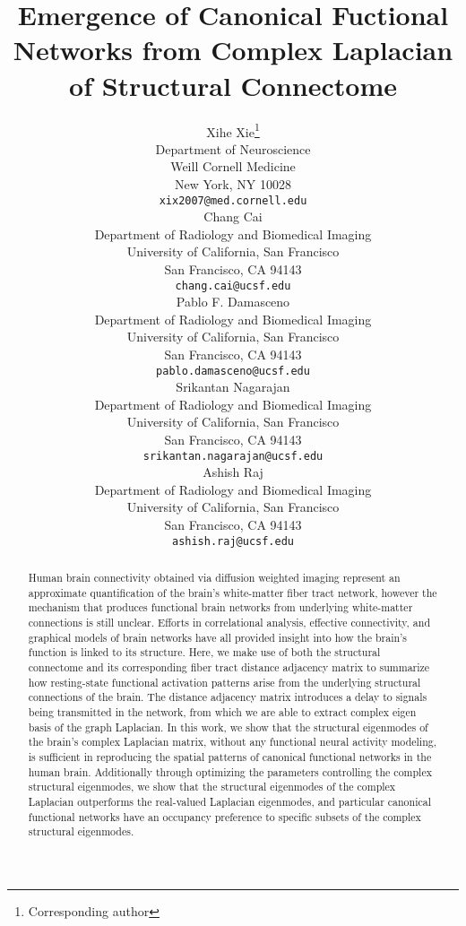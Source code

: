 \documentclass{article}
\title{Emergence of Canonical Fuctional Networks from Complex Laplacian of Structural Connectome}
\author{
  Xihe Xie\thanks{Corresponding author} \\
  Department of Neuroscience\\
  Weill Cornell Medicine\\
  New York, NY 10028 \\
  \texttt{xix2007@med.cornell.edu} \\
   \And
  Chang Cai \\
  Department of Radiology and Biomedical Imaging\\
  University of California, San Francisco\\
  San Francisco, CA 94143\\
  \texttt{chang.cai@ucsf.edu} \\
   \And
  Pablo F. Damasceno \\
  Department of Radiology and Biomedical Imaging\\
  University of California, San Francisco\\
  San Francisco, CA 94143\\
  \texttt{pablo.damasceno@ucsf.edu}\\
  \And
  Srikantan Nagarajan \\
  Department of Radiology and Biomedical Imaging\\
  University of California, San Francisco\\
  San Francisco, CA 94143\\
  \texttt{srikantan.nagarajan@ucsf.edu} \\
  \And
  Ashish Raj \\
  Department of Radiology and Biomedical Imaging\\
  University of California, San Francisco\\
  San Francisco, CA 94143\\
  \texttt{ashish.raj@ucsf.edu} \\
}
\begin{document}
\maketitle

\begin{abstract}
Human brain connectivity obtained via diffusion weighted imaging represent an approximate quantification of the brain's white-matter fiber tract network, however the mechanism that produces functional brain networks from underlying white-matter connections is still unclear. Efforts in correlational analysis, effective connectivity, and graphical models of brain networks have all provided insight into how the brain's function is linked to its structure. Here, we make use of both the structural connectome and its corresponding fiber tract distance adjacency matrix to summarize how resting-state functional activation patterns arise from the underlying structural connections of the brain. The distance adjacency matrix introduces a delay to signals being transmitted in the network, from which we are able to extract complex eigen basis of the graph Laplacian. In this work, we show that the structural eigenmodes of the brain's complex Laplacian matrix, without any functional neural activity modeling, is sufficient in reproducing the spatial patterns of canonical functional networks in the human brain. Additionally through optimizing the parameters controlling the complex structural eigenmodes, we show that the structural eigenmodes of the complex Laplacian outperforms the real-valued Laplacian eigenmodes, and particular canonical functional networks have an occupancy preference to specific subsets of the complex structural eigenmodes. 
\end{abstract}

\end{document}
